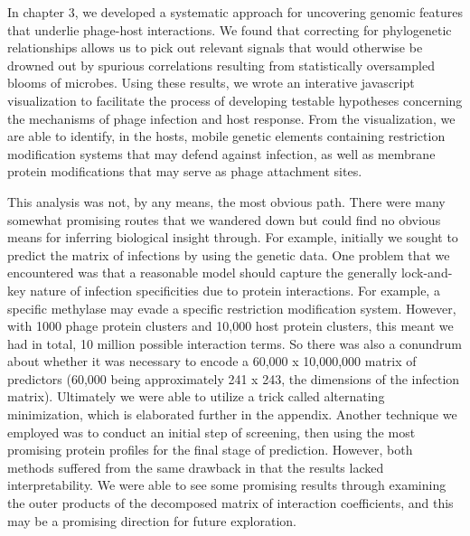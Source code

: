 \documentclass[12pt,twoside]{mitthesis-manusdown}
\begin{document}
In chapter 3, we developed a systematic approach for uncovering genomic
features that underlie phage-host interactions. We found that correcting
for phylogenetic relationships allows us to pick out relevant signals
that would otherwise be drowned out by spurious correlations resulting
from statistically oversampled blooms of microbes. Using these results,
we wrote an interative javascript visualization to facilitate the
process of developing testable hypotheses concerning the mechanisms of
phage infection and host response. From the visualization, we are able
to identify, in the hosts, mobile genetic elements containing
restriction modification systems that may defend against infection, as
well as membrane protein modifications that may serve as phage
attachment sites.

This analysis was not, by any means, the most obvious path. There were
many somewhat promising routes that we wandered down but could find no
obvious means for inferring biological insight through. For example,
initially we sought to predict the matrix of infections by using the
genetic data. One problem that we encountered was that a reasonable
model should capture the generally lock-and-key nature of infection
specificities due to protein interactions. For example, a specific
methylase may evade a specific restriction modification system. However,
with 1000 phage protein clusters and 10,000 host protein clusters, this
meant we had in total, 10 million possible interaction terms. So there
was also a conundrum about whether it was necessary to encode a 60,000 x
10,000,000 matrix of predictors (60,000 being approximately 241 x 243,
the dimensions of the infection matrix). Ultimately we were able to
utilize a trick called alternating minimization, which is elaborated
further in the appendix. Another technique we employed was to conduct an
initial step of screening, then using the most promising protein
profiles for the final stage of prediction. However, both methods
suffered from the same drawback in that the results lacked
interpretability. We were able to see some promising results through
examining the outer products of the decomposed matrix of interaction
coefficients, and this may be a promising direction for future
exploration.
\end{document}
